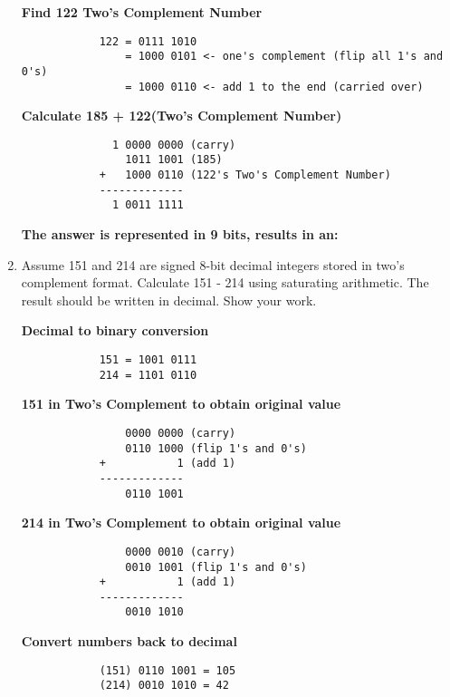 \documentclass{article}
\begin{document}
\begin{enumerate}
        \textbf{Find 122 Two's Complement Number}
        \begin{verbatim}
            122 = 0111 1010
                = 1000 0101 <- one's complement (flip all 1's and 0's)
                = 1000 0110 <- add 1 to the end (carried over)
        \end{verbatim}

        \textbf{Calculate 185 + 122(Two's Complement Number)}
        \begin{verbatim}
              1 0000 0000 (carry)
                1011 1001 (185)
            +   1000 0110 (122's Two's Complement Number)
            -------------
              1 0011 1111
        \end{verbatim}

        \textbf{The answer is represented in 9 bits, results in an: }

        \item Assume 151 and 214 are signed 8-bit decimal integers stored in two's complement format. Calculate 151 - 214 using saturating arithmetic. The result should be written in decimal. Show your work.
        
        \textbf{Decimal to binary conversion}
        \begin{verbatim}
            151 = 1001 0111
            214 = 1101 0110
        \end{verbatim}

        \textbf{151 in Two's Complement to obtain original value}
        \begin{verbatim}
                0000 0000 (carry)
                0110 1000 (flip 1's and 0's)
            +           1 (add 1)
            -------------
                0110 1001
        \end{verbatim}

        \textbf{214 in Two's Complement to obtain original value}
        \begin{verbatim}
                0000 0010 (carry)
                0010 1001 (flip 1's and 0's)
            +           1 (add 1)
            -------------
                0010 1010
        \end{verbatim}

        \textbf{Convert numbers back to decimal}
        \begin{verbatim}
            (151) 0110 1001 = 105
            (214) 0010 1010 = 42
        \end{verbatim}


\end{enumerate}
\end{document}
